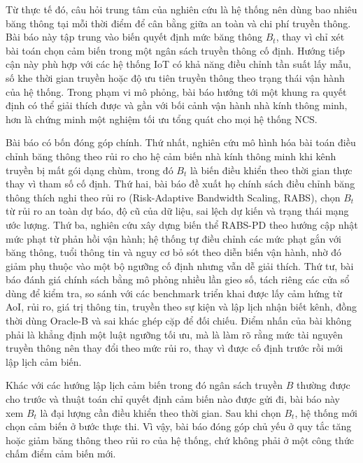 \documentclass[10pt]{article}
\begin{document}
Từ thực tế đó, câu hỏi trung tâm của nghiên cứu là hệ thống nên dùng bao nhiêu băng thông tại mỗi thời điểm để cân bằng giữa an toàn và chi phí truyền thông. Bài báo này tập trung vào biến quyết định mức băng thông $B_t$, thay vì chỉ xét bài toán chọn cảm biến trong một ngân sách truyền thông cố định. Hướng tiếp cận này phù hợp với các hệ thống IoT có khả năng điều chỉnh tần suất lấy mẫu, số khe thời gian truyền hoặc độ ưu tiên truyền thông theo trạng thái vận hành của hệ thống. Trong phạm vi mô phỏng, bài báo hướng tới một khung ra quyết định có thể giải thích được và gần với bối cảnh vận hành nhà kính thông minh, hơn là chứng minh một nghiệm tối ưu tổng quát cho mọi hệ thống NCS.

Bài báo có bốn đóng góp chính. Thứ nhất, nghiên cứu mô hình hóa bài toán điều chỉnh băng thông theo rủi ro cho hệ cảm biến nhà kính thông minh khi kênh truyền bị mất gói dạng chùm, trong đó $B_t$ là biến điều khiển theo thời gian thực thay vì tham số cố định. Thứ hai, bài báo đề xuất họ chính sách điều chỉnh băng thông thích nghi theo rủi ro (Risk-Adaptive Bandwidth Scaling, RABS), chọn $B_t$ từ rủi ro an toàn dự báo, độ cũ của dữ liệu, sai lệch dự kiến và trạng thái mạng ước lượng. Thứ ba, nghiên cứu xây dựng biến thể RABS-PD theo hướng cập nhật mức phạt từ phản hồi vận hành; hệ thống tự điều chỉnh các mức phạt gắn với băng thông, tuổi thông tin và nguy cơ bỏ sót theo diễn biến vận hành, nhờ đó giảm phụ thuộc vào một bộ ngưỡng cố định nhưng vẫn dễ giải thích. Thứ tư, bài báo đánh giá chính sách bằng mô phỏng nhiều lần gieo số, tách riêng các cửa sổ dùng để kiểm tra, so sánh với các benchmark triển khai được lấy cảm hứng từ AoI, rủi ro, giá trị thông tin, truyền theo sự kiện và lập lịch nhận biết kênh, đồng thời dùng Oracle-B và sai khác ghép cặp để đối chiếu. Điểm nhấn của bài không phải là khẳng định một luật ngưỡng tối ưu, mà là làm rõ rằng mức tài nguyên truyền thông nên thay đổi theo mức rủi ro, thay vì được cố định trước rồi mới lập lịch cảm biến.


Khác với các hướng lập lịch cảm biến trong đó ngân sách truyền $B$ thường được cho trước và thuật toán chỉ quyết định cảm biến nào được gửi đi, bài báo này xem $B_t$ là đại lượng cần điều khiển theo thời gian. Sau khi chọn $B_t$, hệ thống mới chọn cảm biến ở bước thực thi. Vì vậy, bài báo đóng góp chủ yếu ở quy tắc tăng hoặc giảm băng thông theo rủi ro của hệ thống, chứ không phải ở một công thức chấm điểm cảm biến mới.
\end{document}
